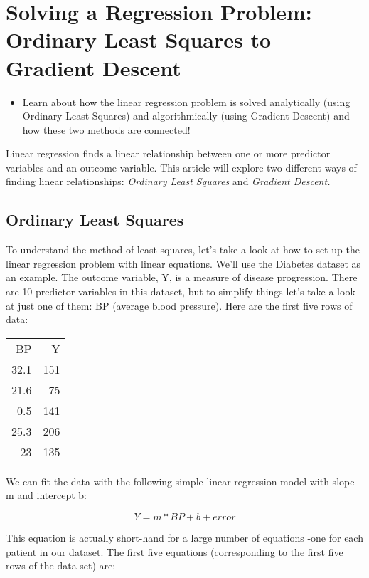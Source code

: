 \documentclass[11pt]{article}
\date{\today}
\title{}
\begin{document}
\tableofcontents

\section{Solving a Regression Problem: Ordinary Least Squares to Gradient Descent}
\label{sec:orgc640652}
\begin{itemize}
\item Learn about how the linear regression problem is solved analytically (using Ordinary Least Squares) and algorithmically (using Gradient Descent) and how these two methods are connected!
\end{itemize}

Linear regression finds a linear relationship between one or more predictor variables and an outcome variable. This article will explore two different ways of  finding linear relationships: \emph{Ordinary Least Squares} and \emph{Gradient Descent.}

\subsection{Ordinary Least Squares}
\label{sec:orgebde171}
To understand the method of least squares, let's take a look at how to set up the linear regression problem with linear equations. We'll use the Diabetes dataset as an example. The outcome variable, Y, is a measure of disease progression. There are 10 predictor variables in this dataset, but to simplify things let's take a look at just one of them: BP (average blood pressure). Here are the first five rows of data:

\begin{center}
\begin{tabular}{rr}
BP & Y\\[0pt]
32.1 & 151\\[0pt]
21.6 & 75\\[0pt]
0.5 & 141\\[0pt]
25.3 & 206\\[0pt]
23 & 135\\[0pt]
\end{tabular}
\end{center}

We can fit the data with the following simple linear regression model with slope m and intercept b:

$$
Y = m * BP + b + error
$$

This equation is actually short-hand for a large number of equations -one for each patient in our dataset. The first five equations (corresponding to the first five rows of the data set) are:
\end{document}
